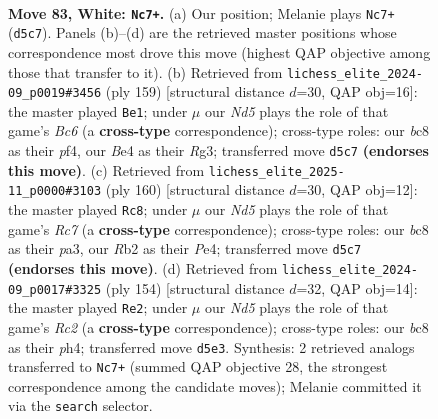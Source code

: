 \documentclass[11pt]{article}
\begin{document}
\clearpage

\begin{figure}[p]\centering
\begin{subfigure}{0.46\textwidth}\centering
\resizebox{\linewidth}{!}{%
\newchessgame
\chessboard[
  setfen={1Bb5/8/4k3/1P1N4/P3B3/2K4p/1R6/6r1 w - - 5 83},
  showmover=false,
  pgfstyle=straightmove, color=movearrow, markmove={d5-c7}
]}
\caption{}
\end{subfigure}\hfill
\begin{subfigure}{0.46\textwidth}\centering
\resizebox{\linewidth}{!}{%
\newchessgame
\chessboard[
  setfen={5k2/8/8/p4K2/P4P1p/2b3r1/2R5/5B2 b - - 5 80},
  showmover=false,
  pgfstyle=straightmove, color=movearrow, markmove={c3-e1}
]}
\caption{}
\end{subfigure}
\\[4pt]
\begin{subfigure}{0.46\textwidth}\centering
\resizebox{\linewidth}{!}{%
\newchessgame
\chessboard[
  setfen={8/2RP4/1k3b2/8/1p2PB2/pP3K2/8/4r3 w - - 5 81},
  showmover=false,
  pgfstyle=straightmove, color=movearrow, markmove={c7-c8}
]}
\caption{}
\end{subfigure}\hfill
\begin{subfigure}{0.46\textwidth}\centering
\resizebox{\linewidth}{!}{%
\newchessgame
\chessboard[
  setfen={5r2/7B/8/6p1/6Pp/1k2b2P/2R3K1/8 w - - 32 78},
  showmover=false,
  pgfstyle=straightmove, color=movearrow, markmove={c2-e2}
]}
\caption{}
\end{subfigure}
\caption{\textbf{Move 83, White: \texttt{Nc7+}.} (a) Our position; Melanie plays \texttt{Nc7+} (\texttt{d5c7}). Panels (b)--(d) are the retrieved master positions whose correspondence most drove this move (highest QAP objective among those that transfer to it). (b) Retrieved from \texttt{lichess\_elite\_2024-09\_p0019\#3456} (ply 159) [structural distance $d$=30, QAP obj=16]: the master played \texttt{Be1}; under $\mu$ our \emph{Nd5} plays the role of that game's \emph{Bc6} (a \textbf{cross-type} correspondence); cross-type roles: our \emph{b}c8 as their \emph{p}f4, our \emph{B}e4 as their \emph{R}g3; transferred move \texttt{d5c7} \textbf{(endorses this move)}. (c) Retrieved from \texttt{lichess\_elite\_2025-11\_p0000\#3103} (ply 160) [structural distance $d$=30, QAP obj=12]: the master played \texttt{Rc8}; under $\mu$ our \emph{Nd5} plays the role of that game's \emph{Rc7} (a \textbf{cross-type} correspondence); cross-type roles: our \emph{b}c8 as their \emph{p}a3, our \emph{R}b2 as their \emph{P}e4; transferred move \texttt{d5c7} \textbf{(endorses this move)}. (d) Retrieved from \texttt{lichess\_elite\_2024-09\_p0017\#3325} (ply 154) [structural distance $d$=32, QAP obj=14]: the master played \texttt{Re2}; under $\mu$ our \emph{Nd5} plays the role of that game's \emph{Rc2} (a \textbf{cross-type} correspondence); cross-type roles: our \emph{b}c8 as their \emph{p}h4; transferred move \texttt{d5e3}. Synthesis: 2 retrieved analogs transferred to \texttt{Nc7+} (summed QAP objective 28, the strongest correspondence among the candidate moves); Melanie committed it via the \texttt{search} selector.}
\label{fig:thought-m164}
\end{figure}
\end{document}
